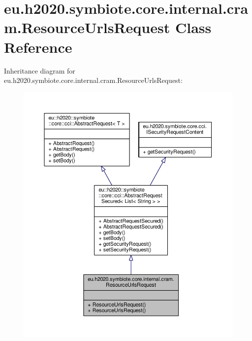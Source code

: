 \hypertarget{classeu_1_1h2020_1_1symbiote_1_1core_1_1internal_1_1cram_1_1ResourceUrlsRequest}{}\section{eu.\+h2020.\+symbiote.\+core.\+internal.\+cram.\+Resource\+Urls\+Request Class Reference}
\label{classeu_1_1h2020_1_1symbiote_1_1core_1_1internal_1_1cram_1_1ResourceUrlsRequest}


Inheritance diagram for eu.\+h2020.\+symbiote.\+core.\+internal.\+cram.\+Resource\+Urls\+Request\+:
\nopagebreak
\begin{figure}[H]
\begin{center}
\leavevmode
\includegraphics[width=350pt]{classeu_1_1h2020_1_1symbiote_1_1core_1_1internal_1_1cram_1_1ResourceUrlsRequest__inherit__graph}
\end{center}
\end{figure}



